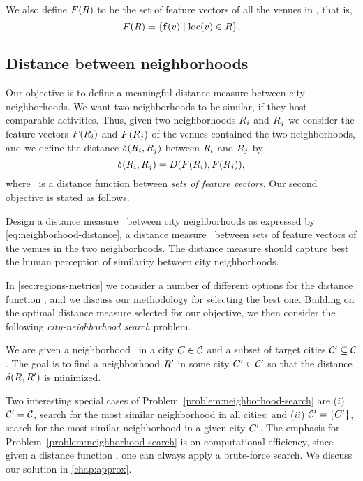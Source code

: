 We also define ${F}({R})$ to be the set of feature vectors of
all the venues in \region, that is, 
\begin{equation*}
 {F}({R}) = \{ {\mathbf{f}}({v}) \mid {\mathrm{loc}}({v})\in{R} \}.  
\end{equation*}


\subsection{Distance between neighborhoods}
\label{sub:neigh-problem}
Our objective is to define a meaningful distance measure between city
neighborhoods.
We want two neighborhoods to be similar, 
if they host comparable activities.
Thus, given two neighborhoods ${R}_i$ and ${R}_j$ 
we consider the feature vectors ${F}({R}_i)$ and
${F}({R}_j)$ of the venues contained the two neighborhoods, and 
we define the distance ${\delta}({R}_i,{R}_j)$ between
${R}_i$ and ${R}_j$ by
\begin{equation}
\label{eq:neighborhood-distance}
{\delta}({R}_i,{R}_j) = 
{D}({F}({R}_i),{F}({R}_j)),
\end{equation}
where \sdist\ is a distance function between 
{\em sets of feature vectors}. 
Our second objective is stated as follows.
\begin{objective}
\label{objective:neighborhood-distance-learning}
Design a distance measure \rdist\ between city neighborhoods as
expressed by \eqref{eq:neighborhood-distance},
\ie{} a distance measure \sdist\ between sets of feature vectors  of the
venues in the two neighborhoods. 
The distance measure should capture best the human
perception of similarity between city neighborhoods. 
\end{objective}
In \autoref{sec:regions-metrics}
we consider a number of different options for the distance function
\sdist, and we discuss our methodology for selecting the best one.
Building on the optimal distance measure selected for our objective, 
we then consider the following {\em city-neighborhood search} problem. 

\begin{problem}
\label{problem:neighborhood-search}
We are given a neighborhood \region\ in a city ${C}\in{\cal C}$
and a subset of target cities ${\cal C}'\subseteq{\cal C}$.
The goal is to find a neighborhood ${R}'$ in some city 
${C}'\in{\cal C}'$ so that the distance
${\delta}({R},{R}')$ is minimized. 
\end{problem}

Two interesting special cases of
Problem~\ref{problem:neighborhood-search} are
($i$)  ${\cal C}'={\cal C}$, 
search for the most similar neighborhood in all cities; 
and 
($ii$) ${\cal C}'=\{C'\}$, 
search for the most similar neighborhood in a given city ${C}'$.
The emphasis for Problem~\ref{problem:neighborhood-search} is on computational
efficiency, since given a distance function \rdist{}, one can always apply a
brute-force search.  We discuss our solution in \autoref{chap:approx}.
